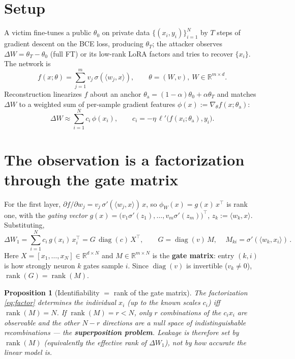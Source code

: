\documentclass[11pt]{article}
\newtheorem{proposition}{Proposition}
\newcommand{\R}{\mathbb{R}}
\newcommand{\dW}{\Delta W}
\newcommand{\ip}[2]{\langle #1, #2\rangle}
\newcommand{\rank}{\operatorname{rank}}
\newcommand{\diag}{\operatorname{diag}}
\begin{document}
\section{Setup}
A victim fine-tunes a public $\theta_0$ on private data $\{(x_i,y_i)\}_{i=1}^N$ by $T$ steps of
gradient descent on the BCE loss, producing $\theta_T$; the attacker observes $\dW=\theta_T-\theta_0$
(full FT) or its low-rank LoRA factors and tries to recover $\{x_i\}$. The network is
\begin{equation}
  f(x;\theta)=\sum_{j=1}^m v_j\,\sigma(\ip{w_j}{x}),\qquad \theta=(W,v),\ W\in\R^{m\times d}.
\end{equation}
Reconstruction linearizes $f$ about an anchor $\theta_{\mathrm a}=(1-\alpha)\theta_0+\alpha\theta_T$ and
matches $\dW$ to a weighted sum of per-sample gradient features $\phi(x):=\nabla_\theta f(x;\theta_{\mathrm a})$:
\begin{equation}\label{eq:obs}
  \dW\approx\sum_{i=1}^N c_i\,\phi(x_i),\qquad c_i=-\eta\,\ell'\!\big(f(x_i;\theta_{\mathrm a}),y_i\big).
\end{equation}

\section{The observation is a factorization through the gate matrix}
For the first layer, $\partial f/\partial w_j = v_j\,\sigma'(\ip{w_j}{x})\,x$, so
$\phi_W(x)=g(x)\,x^\top$ is rank one, with the \emph{gating vector}
$g(x)=\big(v_1\sigma'(z_1),\dots,v_m\sigma'(z_m)\big)^\top$, $z_k:=\ip{w_k}{x}$. Substituting,
\begin{equation}\label{eq:factor}
  \dW_1=\sum_{i=1}^N c_i\,g(x_i)\,x_i^\top=G\,\diag(c)\,X^\top,\qquad
  G=\diag(v)\,M,\quad \boxed{\,M_{ki}=\sigma'(\ip{w_k}{x_i})\,}.
\end{equation}
Here $X=[x_1,\dots,x_N]\in\R^{d\times N}$ and $M\in\R^{m\times N}$ is the \textbf{gate matrix}: entry
$(k,i)$ is how strongly neuron $k$ gates sample $i$. Since $\diag(v)$ is invertible ($v_k\neq0$),
$\rank(G)=\rank(M)$.

\begin{proposition}[Identifiability $=$ rank of the gate matrix]\label{prop:ident}
The factorization \eqref{eq:factor} determines the individual $x_i$ (up to the known scales $c_i$)
\emph{iff $\rank(M)=N$}. If $\rank(M)=r<N$, only $r$ combinations of the $c_ix_i$ are observable and the
other $N-r$ directions are a null space of indistinguishable recombinations --- the \textbf{superposition
problem}. Leakage is therefore set by $\rank(M)$ (equivalently the effective rank of $\dW_1$), not by
how accurate the linear model is.
\end{proposition}
\end{document}
